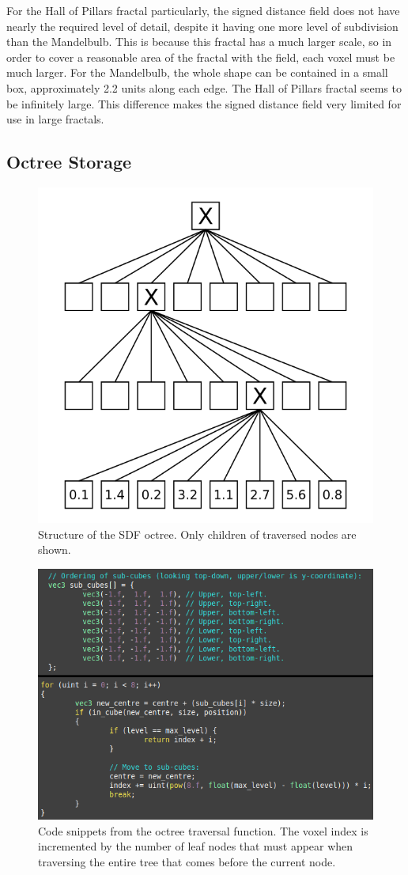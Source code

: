 For the Hall of Pillars fractal particularly, the signed distance field does not have nearly the required level of detail, despite it having one more level of subdivision than the Mandelbulb. This is because this fractal has a much larger scale, so in order to cover a reasonable area of the fractal with the field, each voxel must be much larger. For the Mandelbulb, the whole shape can be contained in a small box, approximately 2.2 units along each edge. The Hall of Pillars fractal seems to be infinitely large. This difference makes the signed distance field very limited for use in large fractals.

\subsection{Octree Storage}

\begin{figure}[ht]
	\centering
	\includegraphics[width=0.4\linewidth, frame]{Images/Octree-Structure.png}
	\caption{Structure of the SDF octree. Only children of traversed nodes are shown.}
	\label{figure:octree-structure}
\end{figure}

\begin{figure}[ht]
	\centering
	\includegraphics[width=0.55\linewidth, frame]{Images/Octree-Traversal.png}
	\caption{Code snippets from the octree traversal function. The voxel index is incremented by the number of leaf nodes that must appear when traversing the entire tree that comes before the current node.}
	\label{figure:octree-traversal}
\end{figure}

